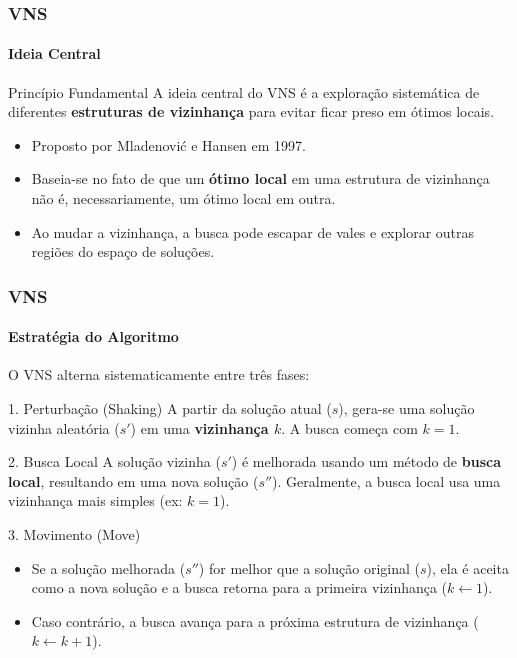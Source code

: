 \documentclass{beamer}
\begin{document}
\begin{frame}
  \frametitle{VNS}
  \framesubtitle{Ideia Central}
  
  \begin{block}{Princípio Fundamental}
    A ideia central do VNS é a exploração sistemática de diferentes \textbf{estruturas de vizinhança} para evitar ficar preso em ótimos locais.
  \end{block}
  
  \begin{itemize}
    \item Proposto por Mladenović e Hansen em 1997.
    \item Baseia-se no fato de que um \textbf{ótimo local} em uma estrutura de vizinhança não é, necessariamente, um ótimo local em outra.
    \item Ao mudar a vizinhança, a busca pode escapar de vales e explorar outras regiões do espaço de soluções.
  \end{itemize}
  
\end{frame}

\begin{frame}
  \frametitle{VNS}
  \framesubtitle{Estratégia do Algoritmo}

  \small
  O VNS alterna sistematicamente entre três fases:
  
  \begin{block}{1. Perturbação (Shaking)}
    A partir da solução atual ($s$), gera-se uma solução vizinha aleatória ($s'$) em uma \textbf{vizinhança $k$}. A busca começa com $k=1$.
  \end{block}
  
  \begin{block}{2. Busca Local}
    A solução vizinha ($s'$) é melhorada usando um método de \textbf{busca local}, resultando em uma nova solução ($s''$). Geralmente, a busca local usa uma vizinhança mais simples (ex: $k=1$).
  \end{block}
  
  \begin{block}{3. Movimento (Move)}
    \footnotesize
    \begin{itemize}
      \item Se a solução melhorada ($s''$) for melhor que a solução original ($s$), ela é aceita como a nova solução e a busca retorna para a primeira vizinhança ($k \leftarrow 1$).
      \item Caso contrário, a busca avança para a próxima estrutura de vizinhança ($k \leftarrow k+1$).
    \end{itemize}
  \end{block}
  
\end{frame}
\end{document}
